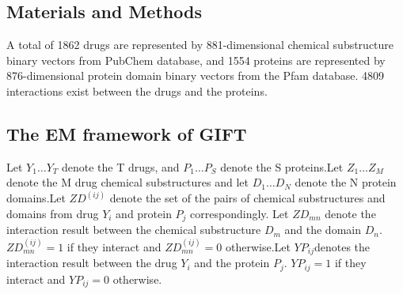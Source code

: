 \documentclass[a0,portrait]{a0poster}
\begin{document}
\begin{multicols}{2}
\color{DarkSlateGray} %

%
%


\section*{Materials and Methods}
 A total of 1862 drugs are represented by 881-dimensional chemical substructure binary vectors from PubChem database, and 1554 proteins are represented by 876-dimensional protein domain binary vectors from the Pfam database. 4809 interactions exist between the drugs and the proteins.


\subsection*{The EM framework of GIFT}


Let $Y_1\ldots Y_T$ denote the T drugs, and $P_1\ldots P_S$ denote the S proteins.Let $Z_1\ldots Z_M$ denote the M drug chemical substructures and let $D_1\ldots D_N$ denote the N protein domains.Let $ZD^{(ij)}$ denote the set of the pairs of chemical substructures and domains from drug $Y_i$ and protein $P_j$ correspondingly. Let $ZD_{mn}$ denote the interaction result between the chemical substructure $D_m$ and the domain $D_n$.$ZD^{(ij)}_{mn} = 1$ if they interact and $ZD^{(ij)}_{mn}=0$ otherwise.Let $YP_{ij}$denotes the interaction result between the drug $Y_i$ and the protein $P_j$. $YP_{ij}=1$ if they interact and $YP_{ij}=0$ otherwise.


\end{multicols}
\end{document}
